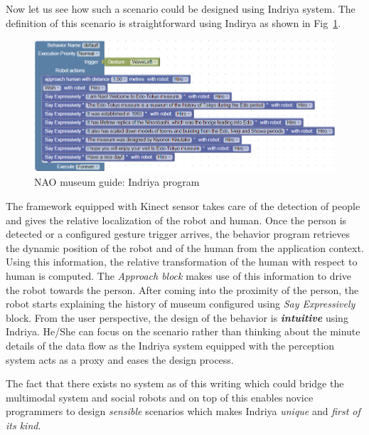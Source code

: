 Now let us see how such a scenario could be designed using Indriya system. The definition of this scenario is straightforward using Indirya as shown in Fig~\ref{fig:scenario1_program}.
\begin{figure}[H]
\centering
\includegraphics[width=\textwidth]{../thesis/assets/scenario1_new.png}
\caption[NAO museum guide: Indriya program]{NAO museum guide: Indriya program}
\label{fig:scenario1_program}
\end{figure}
The framework equipped with Kinect sensor takes care of the detection of people and gives the relative localization of the robot and human. Once the person is detected or a configured gesture trigger arrives, the behavior program retrieves the dynamic position of the robot and of the human from the application context. Using this information, the relative transformation of the human with respect to human is computed. The \emph{Approach block} makes use of this information to drive the robot towards the person. After coming into the proximity of the person, the robot starts explaining the history of museum configured using \emph{Say Expressively} block. From the user perspective, the design of the behavior is \textbf{\emph{intuitive}} using Indriya. He/She can focus on the scenario rather than thinking about the minute details of the data flow as the Indriya system equipped with the perception system acts as a proxy and eases the design process. 

The fact that there exists no system as of this writing which could bridge the multimodal system and social robots and on top of this enables novice programmers to design \emph{sensible} scenarios which makes Indriya \emph{unique} and \emph{first of its kind}.

